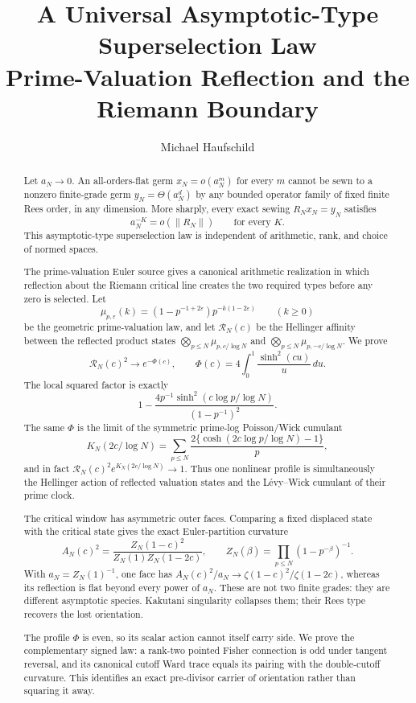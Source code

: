 \documentclass[11pt]{article}
\title{A Universal Asymptotic-Type Superselection Law\\
\large Prime-Valuation Reflection and the Riemann Boundary}
\author{Michael Haufschild}
\date{}
\theoremstyle{definition}
\theoremstyle{remark}
\begin{document}
\maketitle

\begin{abstract}
Let \(a_N\to0\).  An all-orders-flat germ \(x_N=o(a_N^m)\) for every \(m\)
cannot be sewn to a nonzero finite-grade germ \(y_N=\Theta(a_N^d)\) by any bounded
operator family of fixed finite Rees order, in any dimension.  More sharply, every exact
sewing \(R_Nx_N=y_N\) satisfies
\[
 a_N^{-K}=o(\|R_N\|)\qquad\text{for every }K.
\]
This asymptotic-type superselection law is independent of arithmetic, rank, and choice of
normed spaces.

The prime-valuation Euler source gives a canonical arithmetic realization in which reflection
about the Riemann critical line creates the two required types before any zero is selected.  Let
\[
 \mu_{p,\varepsilon}(k)=
 (1-p^{-1+2\varepsilon})p^{-k(1-2\varepsilon)}
 \qquad(k\geq0)
\]
be the geometric prime-valuation law, and let \(\mathcal R_N(c)\) be the Hellinger affinity
between the reflected product states
\(\bigotimes_{p\leq N}\mu_{p,c/\log N}\) and
\(\bigotimes_{p\leq N}\mu_{p,-c/\log N}\).  We prove
\[
 \mathcal R_N(c)^2\longrightarrow e^{-\Phi(c)},\qquad
 \Phi(c)=4\int_0^1\frac{\sinh^2(cu)}u\,du .
\]
The local squared factor is exactly
\[
 1-\frac{4p^{-1}\sinh^2(c\log p/\log N)}{(1-p^{-1})^2}.
\]
The same \(\Phi\) is the limit of the symmetric prime-log Poisson/Wick cumulant
\[
 K_N(2c/\log N)=
 \sum_{p\leq N}\frac{2\{\cosh(2c\log p/\log N)-1\}}p ,
\]
and in fact \(\mathcal R_N(c)^2e^{K_N(2c/\log N)}\to1\).  Thus one nonlinear
profile is simultaneously the Hellinger action of reflected valuation states and the
L\'evy--Wick cumulant of their prime clock.

The critical window has asymmetric outer faces.  Comparing a fixed displaced state with the
critical state gives the exact Euler-partition curvature
\[
 A_N(c)^2=\frac{Z_N(1-c)^2}{Z_N(1)Z_N(1-2c)},\qquad
 Z_N(\beta)=\prod_{p\leq N}(1-p^{-\beta})^{-1}.
\]
With \(a_N=Z_N(1)^{-1}\), one face has
\(A_N(c)^2/a_N\to\zeta(1-c)^2/\zeta(1-2c)\), whereas its reflection is flat
beyond every power of \(a_N\).  These are not two finite grades: they are different asymptotic
species.  Kakutani singularity collapses them; their Rees type recovers the lost orientation.

The profile \(\Phi\) is even, so its scalar action cannot itself carry side.  We prove the
complementary signed law: a rank-two pointed Fisher connection is odd under tangent reversal,
and its canonical cutoff Ward trace equals its pairing with the double-cutoff curvature.  This
identifies an exact pre-divisor carrier of orientation rather than squaring it away.


\end{abstract}
\end{document}
